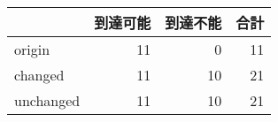 \begin{tabular}{l|rrr} 
  & 到達可能 & 到達不能 & 合計 \\ \hline
  origin & 11 & 0 & 11 \\
  changed & 11 & 10 & 21 \\
  unchanged & 11 & 10 & 21 \\
\end{tabular}